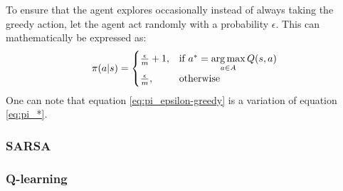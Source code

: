 To ensure that the agent explores occasionally instead of always taking the greedy action, let the agent act randomly with a probability $\epsilon$. This can mathematically be expressed as:
\begin{align}
	\pi(a|s)=\begin{cases}
		\frac{\epsilon}{m}+1, & \text{if $a^* = \operatorname*{arg\,max}\limits_{a \in A}Q (s,a)$}\\
		\frac{\epsilon}{m}, & \text{otherwise}
	\end{cases}
	\label{eq:pi_epsilon-greedy}
\end{align}
One can note that equation \ref{eq:pi_epsilon-greedy} is a variation of equation \ref{eq:pi_*}.

\subsubsection{SARSA}

\subsubsection{Q-learning}